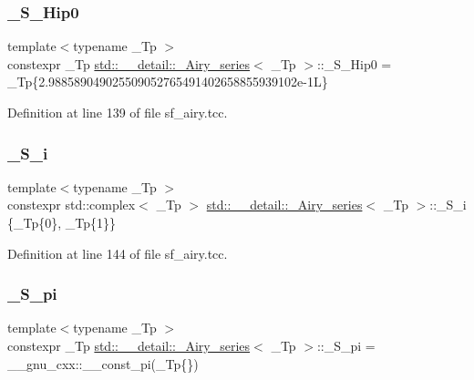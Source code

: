 \subsubsection{\texorpdfstring{\+\_\+\+S\+\_\+\+Hip0}{\_S\_Hip0}}
{\footnotesize\ttfamily template$<$typename \+\_\+\+Tp $>$ \\
constexpr \+\_\+\+Tp \hyperlink{classstd_1_1____detail_1_1__Airy__series}{std\+::\+\_\+\+\_\+detail\+::\+\_\+\+Airy\+\_\+series}$<$ \+\_\+\+Tp $>$\+::\+\_\+\+S\+\_\+\+Hip0 = \+\_\+\+Tp\{2.\+988589049025509052765491402658855939102e-\/1\+L\}\hspace{0.3cm}{\ttfamily [static]}}



Definition at line 139 of file sf\+\_\+airy.\+tcc.

\mbox{\label{classstd_1_1____detail_1_1__Airy__series_a4133b308af0c967a73c918af22c93b09}} 
\subsubsection{\texorpdfstring{\+\_\+\+S\+\_\+i}{\_S\_i}}
{\footnotesize\ttfamily template$<$typename \+\_\+\+Tp $>$ \\
constexpr std\+::complex$<$ \+\_\+\+Tp $>$ \hyperlink{classstd_1_1____detail_1_1__Airy__series}{std\+::\+\_\+\+\_\+detail\+::\+\_\+\+Airy\+\_\+series}$<$ \+\_\+\+Tp $>$\+::\+\_\+\+S\+\_\+i \{\+\_\+\+Tp\{0\}, \+\_\+\+Tp\{1\}\}\hspace{0.3cm}{\ttfamily [static]}}



Definition at line 144 of file sf\+\_\+airy.\+tcc.

\mbox{\label{classstd_1_1____detail_1_1__Airy__series_a9de354dae47d41acc60824681d864184}} 
\subsubsection{\texorpdfstring{\+\_\+\+S\+\_\+pi}{\_S\_pi}}
{\footnotesize\ttfamily template$<$typename \+\_\+\+Tp $>$ \\
constexpr \+\_\+\+Tp \hyperlink{classstd_1_1____detail_1_1__Airy__series}{std\+::\+\_\+\+\_\+detail\+::\+\_\+\+Airy\+\_\+series}$<$ \+\_\+\+Tp $>$\+::\+\_\+\+S\+\_\+pi = \+\_\+\+\_\+gnu\+\_\+cxx\+::\+\_\+\+\_\+const\+\_\+pi(\+\_\+\+Tp\{\})\hspace{0.3cm}{\ttfamily [static]}}



